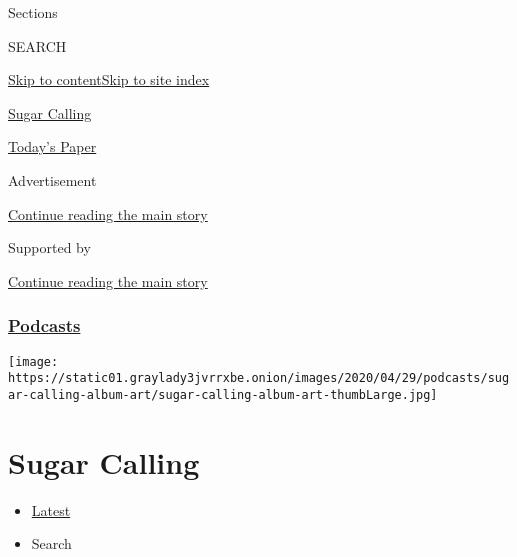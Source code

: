 Sections

SEARCH

\protect\hyperlink{site-content}{Skip to
content}\protect\hyperlink{site-index}{Skip to site index}

\href{https://www.nytimes3xbfgragh.onion/column/sugar-calling}{Sugar
Calling}

\href{https://myaccount.nytimes3xbfgragh.onion/auth/login?response_type=cookie\&client_id=vi}{}

\href{https://www.nytimes3xbfgragh.onion/section/todayspaper}{Today's
Paper}

Advertisement

\protect\hyperlink{after-top}{Continue reading the main story}

Supported by

\protect\hyperlink{after-sponsor}{Continue reading the main story}

\hypertarget{podcasts}{%
\subsubsection{\texorpdfstring{\href{/spotlight/podcasts}{Podcasts}}{Podcasts}}\label{podcasts}}

\texttt{[image: https://static01.graylady3jvrrxbe.onion/images/2020/04/29/podcasts/sugar-calling-album-art/sugar-calling-album-art-thumbLarge.jpg]}

\hypertarget{sugar-calling}{%
\section{Sugar Calling}\label{sugar-calling}}

\begin{itemize}
\tightlist
\item
  \protect\hyperlink{stream-panel}{Latest}
\item
  Search
\end{itemize}

